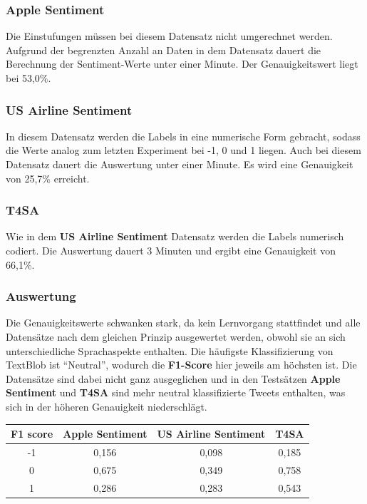 \subsubsection*{Apple Sentiment}
Die Einstufungen m\"ussen bei diesem Datensatz nicht umgerechnet werden. Aufgrund der begrenzten Anzahl an Daten in dem Datensatz dauert die Berechnung der Sentiment-Werte unter einer Minute. Der Genauigkeitswert liegt bei 53,0\%.

\subsubsection*{US Airline Sentiment}
In diesem Datensatz werden die Labels in eine numerische Form gebracht, sodass die Werte analog zum letzten Experiment bei -1, 0 und 1 liegen. Auch bei diesem Datensatz dauert die Auswertung unter einer Minute. Es wird eine Genauigkeit von 25,7\% erreicht.

\subsubsection*{T4SA}
Wie in dem \textbf{US Airline Sentiment} Datensatz werden die Labels numerisch codiert. Die Auswertung dauert 3 Minuten und ergibt eine Genauigkeit von 66,1\%.

\subsubsection*{Auswertung}
Die Genauigkeitswerte schwanken stark, da kein Lernvorgang stattfindet und alle Datens\"atze nach dem gleichen Prinzip ausgewertet werden, obwohl sie an sich unterschiedliche Sprachaspekte enthalten. Die h\"aufigste Klassifizierung von TextBlob ist "`Neutral"', wodurch die \textbf{F1-Score} hier jeweils am h\"ochsten ist. Die Datens\"atze sind dabei nicht ganz ausgeglichen und in den Tests\"atzen \textbf{Apple Sentiment} und \textbf{T4SA} sind mehr neutral klassifizierte Tweets enthalten, was sich in der h\"oheren Genauigkeit niederschl\"agt.
\begin{center}
\begin{tabular}{|c||c|c|c|}
\hline
F1 score & Apple Sentiment & US Airline Sentiment & T4SA\\ 
\hline\hline
-1 & 0,156 & 0,098 & 0,185\\
\hline
0 & 0,675 & 0,349 & 0,758\\ 
\hline
1 & 0,286 & 0,283 & 0,543\\
\hline    
\end{tabular}
\end{center}

